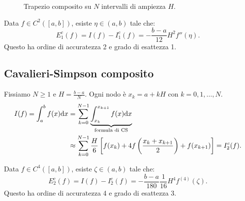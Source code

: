 \begin{figure}[ht]
	\caption{Trapezio composito su $N$ intervalli di ampiezza $H$.}
\end{figure}

\begin{theorem}
Data $f\in C^{2}([ a,b])$, esiste $\eta \in ( a,b)$ tale che:
\begin{equation*}
E^{c}_{1}(f) =I(f) -I^{c}_{1}(f) =-\frac{b-a}{12} H^{2} f''( \eta ).
\end{equation*}
Questo ha ordine di accuratezza 2 e grado di esattezza 1.
\end{theorem}

\subsection{Cavalieri-Simpson composito}
Fissiamo $N\geqslant 1$ e $H=\frac{b-a}{N}$. Ogni nodo è $x_{k} =a+kH$ con $k=0,1,\dotsc ,N$.
\begin{equation*}
\begin{aligned}
I(f) =\int\nolimits ^{b}_{a} f(x) \mathrm d x & =\sum\limits ^{N-1}_{k=0}\underbrace{\int\nolimits ^{x_{k+1}}_{x_{k}} f(x) \mathrm d x}_{\text{formula di CS}}\\
 & \approx \sum\limits ^{N-1}_{k=0}\frac{H}{6}\left[ f( x_{k}) +4f\left(\frac{x_{k} +x_{k+1}}{2}\right) +f( x_{k+1})\right] =I^{c}_{2}(f).
\end{aligned}
\end{equation*}
\begin{theorem}
Data $f\in C^{4}([ a,b])$, esiste $\zeta \in ( a,b)$ tale che:
\begin{equation*}
E^{c}_{2}(f) =I(f) -I^{c}_{2}(f) =-\frac{b-a}{180}\frac{1}{16} H^{4} f^{(4)}( \zeta ).
\end{equation*}
Questo ha ordine di accuratezza 4 e grado di esattezza 3.
\end{theorem}

